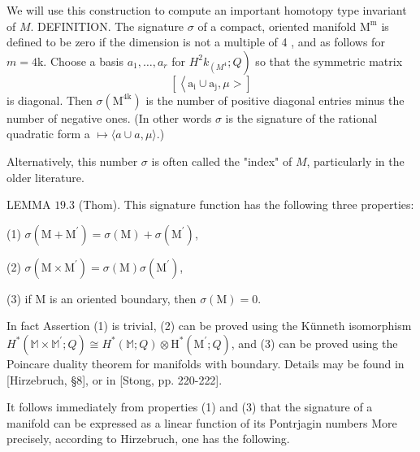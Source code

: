 \documentclass[10pt]{article}
\begin{document}
We will use this construction to compute an important homotopy type invariant of $M$. DEFINITION. The signature $\sigma$ of a compact, oriented manifold $\mathrm{M}^{\mathrm{m}}$ is defined to be zero if the dimension is not a multiple of 4 , and as follows for $m=4 \mathrm{k}$. Choose a basis $a_{1}, \ldots, a_{r}$ for $\left.H^{2} k_{\left(M^{4}\right.} ; Q\right)$ so that the symmetric matrix
$$
\left[\left\langle\mathrm{a}_{\mathrm{i}} \cup \mathrm{a}_{\mathrm{j}}, \mu>\right]\right.
$$
is diagonal. Then $\sigma\left(\mathrm{M}^{4 \mathrm{k}}\right)$ is the number of positive diagonal entries minus the number of negative ones. (In other words $\sigma$ is the signature of the rational quadratic form a $\mapsto\langle a \cup a, \mu\rangle$.)

Alternatively, this number $\sigma$ is often called the "index" of $M$, particularly in the older literature.

LEMMA $19.3$ (Thom). This signature function has the following three properties:

(1) $\sigma\left(\mathrm{M}+\mathrm{M}^{\prime}\right)=\sigma(\mathrm{M})+\sigma\left(\mathrm{M}^{\prime}\right)$,

(2) $\sigma\left(\mathrm{M} \times \mathrm{M}^{\prime}\right)=\sigma(\mathrm{M}) \sigma\left(\mathrm{M}^{\prime}\right)$,

(3) if $\mathrm{M}$ is an oriented boundary, then $\sigma(\mathrm{M})=0$.

In fact Assertion (1) is trivial, (2) can be proved using the Künneth isomorphism $H^{*}\left(\mathbb{M} \times \mathbb{M}^{\prime} ; Q\right) \cong H^{*}(\mathbb{M} ; Q) \otimes \mathrm{H}^{*}\left(\mathrm{M}^{\prime} ; Q\right)$, and (3) can be proved using the Poincare duality theorem for manifolds with boundary. Details may be found in [Hirzebruch, §8], or in [Stong, pp. 220-222].

It follows immediately from properties (1) and (3) that the signature of a manifold can be expressed as a linear function of its Pontrjagin numbers More precisely, according to Hirzebruch, one has the following.
\end{document}
